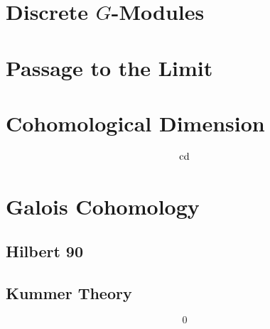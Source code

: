 \documentclass[a4paper, oneside]{memoir}
\begin{document}
\section{Discrete $G$-Modules}
\begin{remark}\label{rm:discGmodUnion}

\end{remark}

\section{Passage to the Limit}
\begin{theorem}\label{thm:IndLim}

\end{theorem}

\begin{example}\label{ex:IntOpenSgr}

\end{example}

\section{Cohomological Dimension}
\begin{proposition}\label{prop:CdSgr}

\end{proposition}

\begin{example}\label{ex:Zhat}

\end{example}

\begin{equation}\label{eq:CdIneq}
    \operatorname{cd}
\end{equation}

\section{Galois Cohomology}

\subsection{Hilbert 90}

\subsection{Kummer Theory}

\begin{equation}\label{eq:Kummer}
    0
\end{equation}
\end{document}
